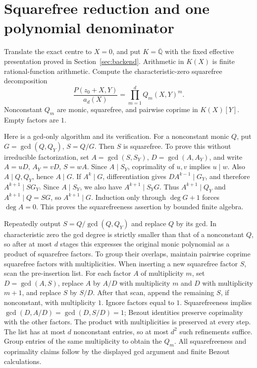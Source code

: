 \documentclass[11pt]{article}
\theoremstyle{definition}
\newcommand{\A}{\overline{\mathbb Q}}
\begin{document}
\section{Squarefree reduction and one polynomial denominator}
\label{sec:reduction}
Translate the exact centre to \(X=0\), and put \(K=\A\) with the fixed
effective presentation proved in Section~\ref{sec:backend}.
Arithmetic in \(K(X)\) is finite rational-function arithmetic.
Compute the characteristic-zero squarefree decomposition
\begin{equation}
 \frac{P(z_0+X,Y)}{a_d(X)}=\prod_{m=1}^d Q_m(X,Y)^m.
 \label{eq:squarefree}
\end{equation}
Nonconstant \(Q_m\) are monic, squarefree, and pairwise coprime in \(K(X)[Y]\).
Empty factors are \(1\).

Here is a gcd-only algorithm and its verification. For a nonconstant monic
\(Q\), put \(G=\gcd(Q,Q_Y)\), \(S=Q/G\). Then \(S\) is squarefree.
To prove this without irreducible factorization, set
\(A=\gcd(S,S_Y)\), \(D=\gcd(A,A_Y)\), and write
\(A=uD\), \(A_Y=vD\), \(S=wA\). Since \(A\mid S_Y\),
coprimality of \(u,v\) implies \(u\mid w\).
Also \(A\mid Q,Q_Y\), hence \(A\mid G\).
If \(A^k\mid G\), differentiation gives
\(DA^{k-1}\mid G_Y\), and therefore \(A^{k+1}\mid SG_Y\).
Since \(A\mid S_Y\), we also have \(A^{k+1}\mid S_YG\).
Thus \(A^{k+1}\mid Q_Y\) and \(A^{k+1}\mid Q=SG\), so
\(A^{k+1}\mid G\). Induction only through \(\deg G+1\) forces \(\deg A=0\).
This proves the squarefreeness assertion by bounded finite algebra.

Repeatedly output \(S=Q/\gcd(Q,Q_Y)\) and replace \(Q\) by its gcd.
In characteristic zero the gcd degree is strictly smaller than that of a
nonconstant \(Q\), so after at most \(d\) stages this expresses the original
monic polynomial as a product of squarefree factors. To group their
overlaps, maintain pairwise coprime squarefree factors with multiplicities.
When inserting a new squarefree factor \(S\), scan the pre-insertion list.
For each factor \(A\)
of multiplicity \(m\), set \(D=\gcd(A,S)\), replace \(A\) by \(A/D\)
with multiplicity \(m\) and \(D\) with multiplicity \(m+1\), and replace
\(S\) by \(S/D\). After that scan, append the remaining \(S\), if nonconstant,
with multiplicity \(1\). Ignore factors equal to \(1\). Squarefreeness implies
\(\gcd(D,A/D)=\gcd(D,S/D)=1\); Bezout identities preserve coprimality with
the other factors. The product with multiplicities is preserved at every
step. The list has at most \(d\) nonconstant entries, so at most \(d^2\)
such refinements suffice. Group entries of the same multiplicity to obtain
the \(Q_m\). All squarefreeness and coprimality claims follow by the displayed
gcd argument and finite Bezout calculations.
\end{document}
